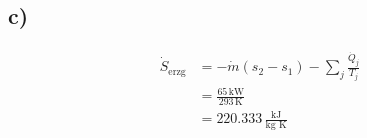 

\subsection*{c)}
\begin{align*}
\dot{S}_{\text{erzg}} & = -\dot{m} (s_2 - s_1) - \sum_j \frac{\dot{Q}_j}{T_j} \\
& = \frac{65 \, \text{kW}}{293 \, \text{K}} \\
& = 220.333 \, \frac{\text{kJ}}{\text{kg K}}
\end{align*}